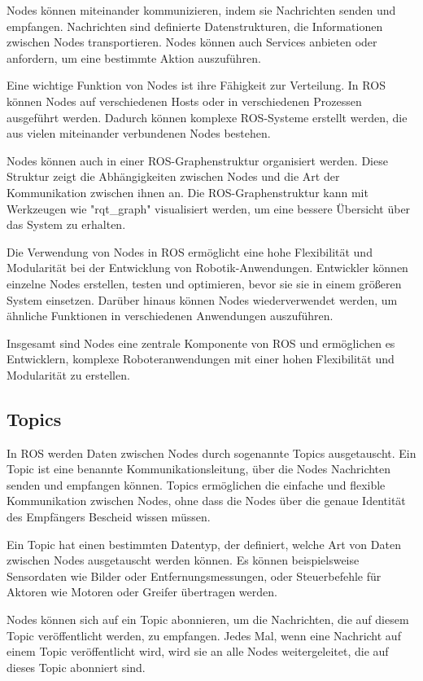     Nodes können miteinander kommunizieren, indem sie Nachrichten senden und empfangen. Nachrichten sind definierte Datenstrukturen, die Informationen zwischen Nodes transportieren. Nodes können auch Services anbieten oder anfordern, um eine bestimmte Aktion auszuführen.

    Eine wichtige Funktion von Nodes ist ihre Fähigkeit zur Verteilung. In \ac{ROS} können Nodes auf verschiedenen Hosts oder in verschiedenen Prozessen ausgeführt werden. Dadurch können komplexe \ac{ROS}-Systeme erstellt werden, die aus vielen miteinander verbundenen Nodes bestehen.

    Nodes können auch in einer \ac{ROS}-Graphenstruktur organisiert werden. Diese Struktur zeigt die Abhängigkeiten zwischen Nodes und die Art der Kommunikation zwischen ihnen an. Die \ac{ROS}-Graphenstruktur kann mit Werkzeugen wie "rqt\_graph" visualisiert werden, um eine bessere Übersicht über das System zu erhalten.

    Die Verwendung von Nodes in \ac{ROS} ermöglicht eine hohe Flexibilität und Modularität bei der Entwicklung von Robotik-Anwendungen. Entwickler können einzelne Nodes erstellen, testen und optimieren, bevor sie sie in einem größeren System einsetzen. Darüber hinaus können Nodes wiederverwendet werden, um ähnliche Funktionen in verschiedenen Anwendungen auszuführen.

    Insgesamt sind Nodes eine zentrale Komponente von \ac{ROS} und ermöglichen es Entwicklern, komplexe Roboteranwendungen mit einer hohen Flexibilität und Modularität zu erstellen.

    \subsection{Topics} \label{topics:subsection}
    In \ac{ROS} werden Daten zwischen Nodes durch sogenannte Topics ausgetauscht. Ein Topic ist eine benannte Kommunikationsleitung, über die Nodes Nachrichten senden und empfangen können. Topics ermöglichen die einfache und flexible Kommunikation zwischen Nodes, ohne dass die Nodes über die genaue Identität des Empfängers Bescheid wissen müssen.

    Ein Topic hat einen bestimmten Datentyp, der definiert, welche Art von Daten zwischen Nodes ausgetauscht werden können. Es können beispielsweise Sensordaten wie Bilder oder Entfernungsmessungen, oder Steuerbefehle für Aktoren wie Motoren oder Greifer übertragen werden.

    Nodes können sich auf ein Topic abonnieren, um die Nachrichten, die auf diesem Topic veröffentlicht werden, zu empfangen. Jedes Mal, wenn eine Nachricht auf einem Topic veröffentlicht wird, wird sie an alle Nodes weitergeleitet, die auf dieses Topic abonniert sind.

